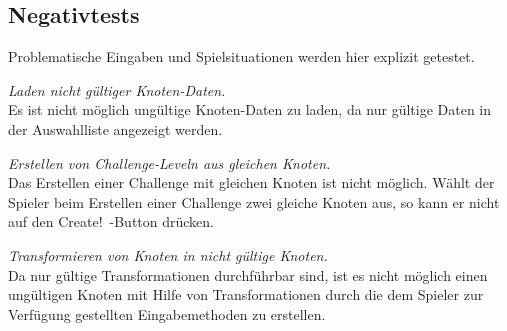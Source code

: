 %



\newpage



\label{Abschnitt:Tests:Protokoll:Negativ}



\subsection*{Negativtests}

Problematische Eingaben und Spielsituationen werden hier explizit getestet.\\



\begin{description}



\label{NT:10}

	\item[NT\_10] \textit{Laden nicht gültiger Knoten-Daten.} \hfill\\
	
	Es ist nicht möglich ungültige Knoten-Daten zu laden, da nur gültige Daten in der Auswahlliste angezeigt werden.\\

	

\label{NT:20}
	
	\item[NT\_20] \textit{Erstellen von Challenge-Leveln aus gleichen Knoten.} \hfill\\
	
	Das Erstellen einer Challenge mit gleichen Knoten ist nicht möglich. Wählt der Spieler beim Erstellen einer Challenge zwei gleiche Knoten aus, so kann er nicht auf den \glqq Create!\grqq~-Button drücken.\\
	
	

\label{NT:30}

	\item[NT\_30] \textit{Transformieren von Knoten in nicht gültige Knoten.} \hfill\\
	
	Da nur gültige Transformationen durchführbar sind, ist es nicht möglich einen ungültigen Knoten mit Hilfe von Transformationen durch die dem Spieler zur Verfügung gestellten Eingabemethoden zu erstellen.\\
	


\end{description}
